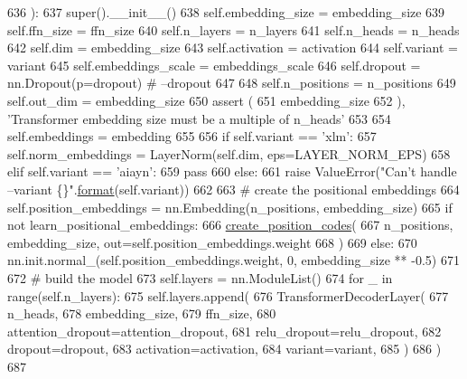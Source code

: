 \begin{DoxyCode}
636     ):
637         super().\_\_init\_\_()
638         self.embedding\_size = embedding\_size
639         self.ffn\_size = ffn\_size
640         self.n\_layers = n\_layers
641         self.n\_heads = n\_heads
642         self.dim = embedding\_size
643         self.activation = activation
644         self.variant = variant
645         self.embeddings\_scale = embeddings\_scale
646         self.dropout = nn.Dropout(p=dropout)  \textcolor{comment}{# --dropout}
647 
648         self.n\_positions = n\_positions
649         self.out\_dim = embedding\_size
650         \textcolor{keyword}{assert} (
651             embedding\_size %
652         ), \textcolor{stringliteral}{'Transformer embedding size must be a multiple of n\_heads'}
653 
654         self.embeddings = embedding
655 
656         \textcolor{keywordflow}{if} self.variant == \textcolor{stringliteral}{'xlm'}:
657             self.norm\_embeddings = LayerNorm(self.dim, eps=LAYER\_NORM\_EPS)
658         \textcolor{keywordflow}{elif} self.variant == \textcolor{stringliteral}{'aiayn'}:
659             \textcolor{keywordflow}{pass}
660         \textcolor{keywordflow}{else}:
661             \textcolor{keywordflow}{raise} ValueError(\textcolor{stringliteral}{"Can't handle --variant \{\}"}.\hyperlink{namespaceparlai_1_1chat__service_1_1services_1_1messenger_1_1shared__utils_a32e2e2022b824fbaf80c747160b52a76}{format}(self.variant))
662 
663         \textcolor{comment}{# create the positional embeddings}
664         self.position\_embeddings = nn.Embedding(n\_positions, embedding\_size)
665         \textcolor{keywordflow}{if} \textcolor{keywordflow}{not} learn\_positional\_embeddings:
666             \hyperlink{namespaceparlai_1_1agents_1_1transformer_1_1modules_a0b86437e6e9682fa3100e9cadcaae259}{create\_position\_codes}(
667                 n\_positions, embedding\_size, out=self.position\_embeddings.weight
668             )
669         \textcolor{keywordflow}{else}:
670             nn.init.normal\_(self.position\_embeddings.weight, 0, embedding\_size ** -0.5)
671 
672         \textcolor{comment}{# build the model}
673         self.layers = nn.ModuleList()
674         \textcolor{keywordflow}{for} \_ \textcolor{keywordflow}{in} range(self.n\_layers):
675             self.layers.append(
676                 TransformerDecoderLayer(
677                     n\_heads,
678                     embedding\_size,
679                     ffn\_size,
680                     attention\_dropout=attention\_dropout,
681                     relu\_dropout=relu\_dropout,
682                     dropout=dropout,
683                     activation=activation,
684                     variant=variant,
685                 )
686             )
687 
\end{DoxyCode}


